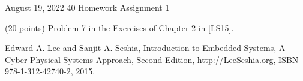 \documentclass[a4paper,12pt]{article}
\begin{document}

{August 19, 2022}                           %
{40}                      %
{Homework Assignment 1}             %



\begin{problem}{}
(20 points) Problem 7 in the Exercises of Chapter 2 in [LS15].

\noindent
[LS15] Edward A. Lee and Sanjit A. Seshia, Introduction to Embedded Systems, A Cyber-Physical Systems Approach, Second Edition, http://LeeSeshia.org, ISBN 978-1-312-42740-2, 2015. \\
\\
\begin{minipage}{1\textwidth}
  \rectangle{\linewidth}{20cm}
\end{minipage}
\newpage
\ \\
\begin{minipage}{1\textwidth}
  \rectangle{\linewidth}{24cm}
\end{minipage}
\newpage
\ \\
\begin{minipage}{1\textwidth}
  \rectangle{\linewidth}{24cm}
\end{minipage}
\newpage
\ \\
\begin{minipage}{1\textwidth}
  \rectangle{\linewidth}{24cm}
\end{minipage}
\end{problem}

\newpage
\end{document}
